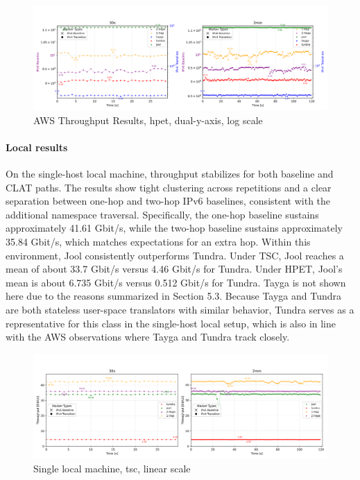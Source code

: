 \begin{figure}[H]
    \centering
    \includegraphics[width=1\textwidth]{resources/plots/JitterPlot/AWS_tcp_dualAxis_hpet_log.png}
    \caption{AWS Throughput Results, hpet, dual-y-axis, log scale}
    \label{fig:AWS_tcp_dualAxis_hpet_log}
\end{figure}



\paragraph{Local results}

On the single-host local machine, throughput stabilizes for both baseline and CLAT paths. The results show tight clustering across repetitions and a clear separation between one-hop and two-hop IPv6 baselines, consistent with the additional namespace traversal. Specifically, the one-hop baseline sustains approximately 41.61 Gbit/s, while the two-hop baseline sustains approximately 35.84 Gbit/s, which matches expectations for an extra hop. Within this environment, Jool consistently outperforms Tundra. Under TSC, Jool reaches a mean of about 33.7 Gbit/s versus 4.46 Gbit/s for Tundra. Under HPET, Jool's mean is about 6.735 Gbit/s versus 0.512 Gbit/s for Tundra. Tayga is not shown here due to the reasons summarized in Section 5.3. Because Tayga and Tundra are both stateless user-space translators with similar behavior, Tundra serves as a representative for this class in the single-host local setup, which is also in line with the AWS observations where Tayga and Tundra track closely.

\begin{figure}[H]
    \centering
    \includegraphics[width=1\textwidth]{resources/plots/CombinedPlot/TCP/Single_tcp_sameScale_tsc_linear.png}
    \caption{Single local machine, tsc, linear scale}
    \label{fig:Local_tcp_sameScale_tsc_linear}
\end{figure}

